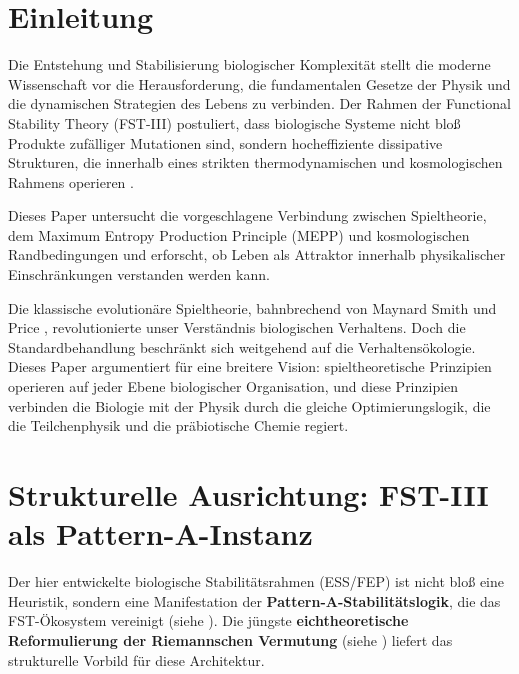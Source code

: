 \documentclass[12pt,a4paper]{article}
\theoremstyle{remark}
\begin{document}
\section{Einleitung}
\label{sec:introduction}

Die Entstehung und Stabilisierung biologischer Komplexit\"at stellt die moderne Wissenschaft vor die Herausforderung, die fundamentalen Gesetze der Physik und die dynamischen Strategien des Lebens zu verbinden. Der Rahmen der Functional Stability Theory (FST-III) postuliert, dass biologische Systeme nicht blo\ss{} Produkte zuf\"alliger Mutationen sind, sondern hocheffiziente dissipative Strukturen, die innerhalb eines strikten thermodynamischen und kosmologischen Rahmens operieren \citep{EcosystemMEPP}.

Dieses Paper untersucht die vorgeschlagene Verbindung zwischen Spieltheorie, dem Maximum Entropy Production Principle (MEPP) und kosmologischen Randbedingungen und erforscht, ob Leben als Attraktor innerhalb physikalischer Einschr\"ankungen verstanden werden kann.

Die klassische evolution\"are Spieltheorie, bahnbrechend von Maynard Smith und Price \citep{MaynardSmith1982}, revolutionierte unser Verst\"andnis biologischen Verhaltens. Doch die Standardbehandlung beschr\"ankt sich weitgehend auf die Verhaltens\"okologie. Dieses Paper argumentiert f\"ur eine breitere Vision: spieltheoretische Prinzipien operieren auf jeder Ebene biologischer Organisation, und diese Prinzipien verbinden die Biologie mit der Physik durch die gleiche Optimierungslogik, die die Teilchenphysik \citep{FSTI} und die pr\"abiotische Chemie \citep{FSTII} regiert.

\section{Strukturelle Ausrichtung: FST-III als Pattern-A-Instanz}
\label{sec:structural-alignment}

Der hier entwickelte biologische Stabilit\"atsrahmen (ESS/FEP) ist nicht blo\ss{} eine Heuristik, sondern eine Manifestation der \textbf{Pattern-A-Stabilit\"atslogik}, die das FST-\"Okosystem vereinigt (siehe \cite{FST-Unified2026}). Die j\"ungste \textbf{eichtheoretische Reformulierung der Riemannschen Vermutung} (siehe \cite{FST-RH3}) liefert das strukturelle Vorbild f\"ur diese Architektur.
\end{document}

